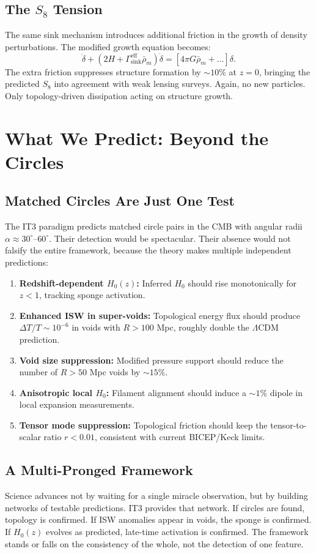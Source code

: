\documentclass[12pt,a4paper]{report}
\begin{document}
\section{The $S_8$ Tension}
The same sink mechanism introduces additional friction in the growth of density perturbations. The modified growth equation becomes:
$$
\ddot{\delta} + (2H + \Gamma_{\text{sink}}^{\text{eff}}\bar{\rho}_m)\dot{\delta} = [4\pi G\bar{\rho}_m + \dots]\delta.
$$
The extra friction suppresses structure formation by $\sim 10\%$ at $z=0$, bringing the predicted $S_8$ into agreement with weak lensing surveys. Again, no new particles. Only topology-driven dissipation acting on structure growth.

\chapter{What We Predict: Beyond the Circles}
\section{Matched Circles Are Just One Test}
The IT3 paradigm predicts matched circle pairs in the CMB with angular radii $\alpha \approx 30^\circ\text{--}60^\circ$. Their detection would be spectacular. Their absence would not falsify the entire framework, because the theory makes multiple independent predictions:
\begin{enumerate}
    \item \textbf{Redshift-dependent $H_0(z)$:} Inferred $H_0$ should rise monotonically for $z < 1$, tracking sponge activation.
    \item \textbf{Enhanced ISW in super-voids:} Topological energy flux should produce $\Delta T/T \sim 10^{-6}$ in voids with $R > 100$ Mpc, roughly double the $\Lambda$CDM prediction.
    \item \textbf{Void size suppression:} Modified pressure support should reduce the number of $R > 50$ Mpc voids by $\sim 15\%$.
    \item \textbf{Anisotropic local $H_0$:} Filament alignment should induce a $\sim 1\%$ dipole in local expansion measurements.
    \item \textbf{Tensor mode suppression:} Topological friction should keep the tensor-to-scalar ratio $r < 0.01$, consistent with current BICEP/Keck limits.
\end{enumerate}

\section{A Multi-Pronged Framework}
Science advances not by waiting for a single miracle observation, but by building networks of testable predictions. IT3 provides that network. If circles are found, topology is confirmed. If ISW anomalies appear in voids, the sponge is confirmed. If $H_0(z)$ evolves as predicted, late-time activation is confirmed. The framework stands or falls on the consistency of the whole, not the detection of one feature.
\end{document}
